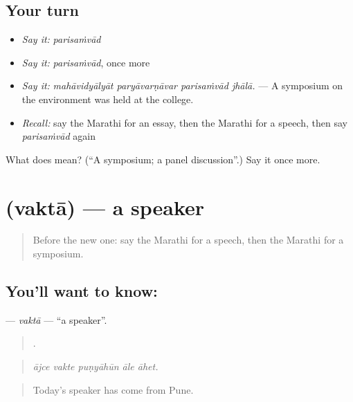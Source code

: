 \subsection*{Your turn}
\begin{itemize}
\raggedright
  \item \emph{Say it:} \emph{parisaṁvād}
  \item \emph{Say it:} \emph{parisaṁvād}, once more
  \item \emph{Say it:} \emph{mahāvidyālyāt paryāvarṇāvar parisaṁvād jhālā.} — A symposium on the environment was held at the college.
  \item \emph{Recall:} say the Marathi for an essay, then the Marathi for a speech, then say \emph{parisaṁvād} again
\end{itemize}

\begin{tcolorbox}[breakable,colback=teal!4,colframe=teal!35!black,title={Before you move on}]
What does  mean? (\textquotedblleft{}A symposium; a panel discussion\textquotedblright{}.) Say it once more.
\end{tcolorbox}
\section[\texorpdfstring{\mr{वक्ता} (vaktā)}{वक्ता (vaktā)}]{ (vaktā) — a speaker}

\label{lesson:MR-C370-vakta}



\begin{quote}
Before the new one: say the Marathi for a speech, then the Marathi for a symposium.
\end{quote}

\subsection*{You'll want to know: }
\textbf{} — \emph{vaktā} — \textquotedblleft{}a speaker\textquotedblright{}.

\begin{quote}
    .
\end{quote}

\begin{quote}
\emph{ājce vakte puṇyāhūn āle āhet.}
\end{quote}

\begin{quote}
Today's speaker has come from Pune.
\end{quote}

